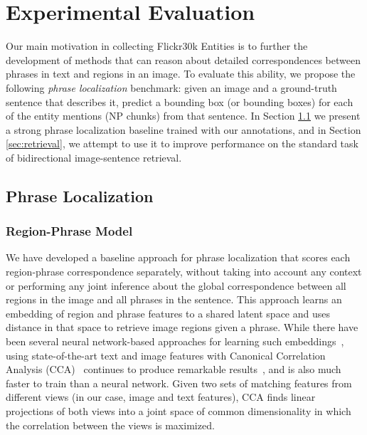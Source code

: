 \documentclass[twocolumn]{svjour3}
\begin{document}
 \section{Experimental Evaluation} 
\label{sec:results}

Our main motivation in collecting Flickr30k Entities is to further the development of methods that can reason about detailed correspondences between phrases in text and regions in an image. To evaluate this ability, we propose the following {\em phrase localization} benchmark: given an image and a ground-truth sentence that describes it, predict a bounding box (or bounding boxes) for each of the entity mentions (NP chunks) from that sentence. In Section \ref{sec:localization} we present a strong phrase localization baseline trained with our annotations, and in Section \ref{sec:retrieval}, we attempt to use it to improve performance on the standard task of bidirectional image-sentence retrieval.

\subsection{Phrase Localization} \label{sec:localization}


\subsubsection{Region-Phrase Model}
\label{sec:regionPhrase}

We have developed a baseline approach for phrase localization that scores each region-phrase correspondence separately, without taking into account any context or performing any joint inference about the global correspondence between all regions in the image and all phrases in the sentence. This approach learns an embedding of region and phrase features to a shared latent space and uses distance in that space to retrieve image regions given a phrase. While there have been several neural network-based approaches for learning such embeddings~\citep{karpathy2014deep,kiros2014unifying,mao2014deep}, using state-of-the-art text and image features with Canonical Correlation Analysis (CCA)~\citep{hotelling1936relations} continues to produce remarkable results~\citep{gong2014improving,klein2014fisher,klein2015rnn}, and is also much faster to train than a neural network. Given two sets of matching features from different views (in our case, image and text features), CCA finds linear projections of both views into a joint space of common dimensionality in which the correlation between the views is maximized.
\end{document}
